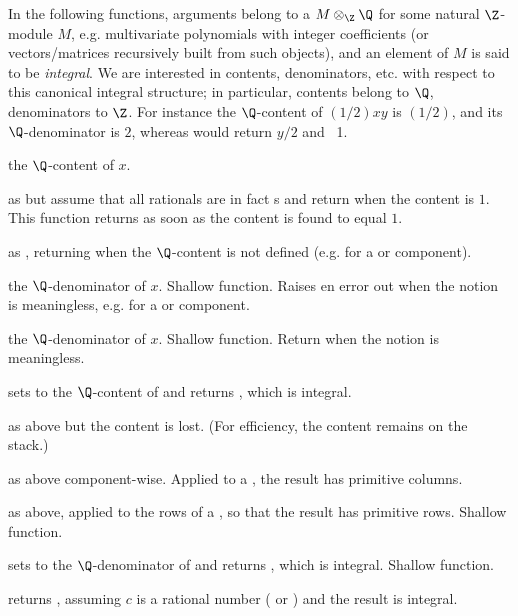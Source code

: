 In the following functions, arguments belong to a $M\otimes_\Z\Q$
for some natural $\Z$-module $M$, e.g. multivariate polynomials with integer
coefficients (or vectors/matrices recursively built from such objects), and
an element of $M$ is said to be \emph{integral}.
We are interested in contents, denominators, etc. with respect to this
canonical integral structure; in particular, contents belong to $\Q$,
denominators to $\Z$. For instance the $\Q$-content of $(1/2)xy$ is $(1/2)$,
and its $\Q$-denominator is $2$, whereas  would return $y/2$ and
~1.

 the $\Q$-content of $x$.

 as  but assume that all rationals
are in fact s and return  when the content is $1$. This
function returns as soon as the content is found to equal $1$.

 as , returning
 when the $\Q$-content is not defined (e.g. for a 
or  component).

 the $\Q$-denominator of $x$. Shallow function.
Raises en  error out when the notion is meaningless, e.g. for
a  or  component.

 the $\Q$-denominator of $x$. Shallow function.
Return  when the notion is meaningless.

 sets  to the $\Q$-content
of  and returns , which is integral.

 as above but the content is lost. (For
efficiency, the content remains on the stack.)

 as above component-wise. Applied to a
, the result has primitive columns.

 as above, applied to the rows of a
, so that the result has primitive rows. Shallow function.

 sets  to the
$\Q$-denominator of  and returns , which is integral.
Shallow function.

 returns , assuming $c$
is a rational number ( or ) and the result is integral.

